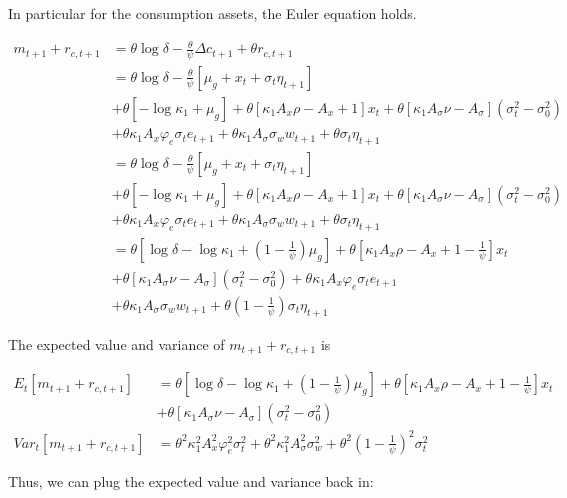 \documentclass{article}
\begin{document}
\begin{enumerate}
\pagebreak

In particular for the consumption assets, the Euler equation holds. 

\begin{align*}
m_{t+1} + r_{c,t+1} 
&= \theta \log \delta - \frac{\theta}{\psi} \Delta c_{t+1} + \theta r_{c,t+1}\\
&=\theta \log \delta - \frac{\theta}{\psi} [\mu_g + x_t + \sigma_t \eta_{t+1}] \\
&+ \theta[-\log \kappa_1 + \mu_g] + 
\theta[\kappa_1 A_x \rho - A_x + 1] x_t
+ \theta[\kappa_1 A_\sigma \nu - A_\sigma](\sigma_t^2 - \sigma_0^2) \\
&+ \theta\kappa_1 A_x \varphi_e \sigma_t e_{t+1} 
+ \theta\kappa_1 A_\sigma \sigma_w w_{t+1}
+ \theta\sigma_t \eta_{t+1}\\
&=\theta \log \delta - \frac{\theta}{\psi} [\mu_g + x_t + \sigma_t \eta_{t+1}] \\
&+ \theta[-\log \kappa_1 + \mu_g] + 
\theta[\kappa_1 A_x \rho - A_x + 1] x_t
+ \theta[\kappa_1 A_\sigma \nu - A_\sigma](\sigma_t^2 - \sigma_0^2) \\
&+ \theta\kappa_1 A_x \varphi_e \sigma_t e_{t+1} 
+ \theta\kappa_1 A_\sigma \sigma_w w_{t+1}
+ \theta\sigma_t \eta_{t+1}\\
&= \theta[\log \delta - \log \kappa_1 + (1- \frac{1}{\psi})\mu_g ] + \theta[\kappa_1 A_x \rho - A_x + 1 - \frac{1}{\psi}] x_t \\
&+ \theta[\kappa_1 A_\sigma \nu - A_\sigma](\sigma_t^2 - \sigma_0^2) + \theta\kappa_1 A_x \varphi_e \sigma_t e_{t+1}  \\
&+ \theta\kappa_1 A_\sigma \sigma_w w_{t+1} + \theta (1-\frac{1}{\psi}) \sigma_t \eta_{t+1}
\end{align*}

The expected value and variance of $m_{t+1} + r_{c,t+1}$ is

\begin{align*}
E_t[m_{t+1} + r_{c,t+1}] 
&= \theta[\log \delta - \log \kappa_1 + (1- \frac{1}{\psi})\mu_g ] + \theta[\kappa_1 A_x \rho - A_x + 1 - \frac{1}{\psi}] x_t \\
&+ \theta[\kappa_1 A_\sigma \nu - A_\sigma](\sigma_t^2 - \sigma_0^2)\\
Var_t[m_{t+1} + r_{c,t+1}]
&= \theta^2\kappa_1^2 A_x^2 \varphi_e^2 \sigma_t^2  + \theta^2\kappa_1^2 A_\sigma^2 \sigma_w^2 + \theta^2 (1-\frac{1}{\psi})^2 \sigma_t^2
\end{align*}

Thus, we can plug the expected value and variance back in:


\end{enumerate}
\end{document}
